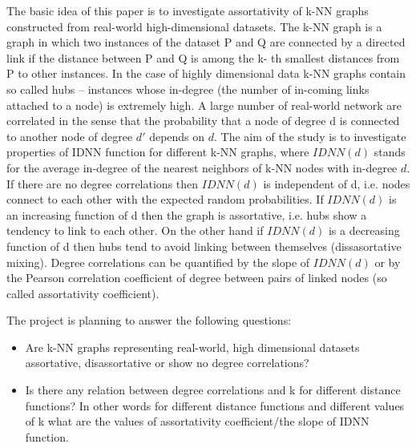 The basic idea of this paper is to investigate assortativity of k-NN graphs constructed from real-world high-dimensional datasets.
The k-NN graph is a graph in which two instances of the dataset P and Q are connected by a directed link if the distance between P and Q is among the k- th smallest distances from P to other instances.
In the case of highly dimensional data k-NN graphs contain so called hubs – instances whose in-degree (the number of in-coming links attached to a node) is extremely high.
A large number of real-world network are correlated in the sense that the probability that a node of degree d is connected to another node of degree $d'$ depends on $d$.
The aim of the study is to investigate properties of IDNN function for different k-NN graphs, where $IDNN(d)$ stands for the average in-degree of the nearest neighbors of k-NN nodes with in-degree $d$.
If there are no degree correlations then $IDNN(d)$ is independent of d, i.e. nodes connect to each other with the expected random probabilities.
If $IDNN(d)$ is an increasing function of d then the graph is assortative, i.e. hubs show a tendency to link to each other.
On the other hand if $IDNN(d)$ is a decreasing function of d then hubs tend to avoid linking between themselves (dissasortative mixing).
Degree correlations can be quantified by the slope of $IDNN(d)$ or by the Pearson correlation coefficient of degree between pairs of linked nodes (so called assortativity coefficient).

The project is planning to answer the following questions:
\begin{itemize}
\item Are k-NN graphs representing real-world, high dimensional datasets assortative, disassortative or show no degree correlations?
\item Is there any relation between degree correlations and k for different distance functions? In other words for different distance functions and different values of k what are the values of assortativity coefficient/the slope of IDNN function.
\end{itemize}

